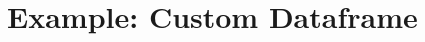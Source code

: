 \documentclass{tufte-book} %
\begin{document}
\section{Example: Custom Dataframe}
\lipsum[13-20]


\backmatter




\printindex %
\end{document}
